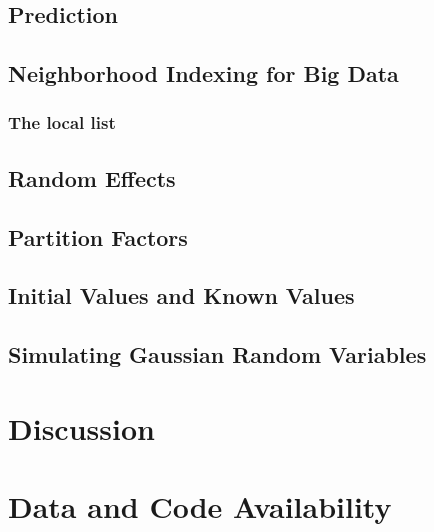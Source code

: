 \documentclass{article}
\begin{document}
\hypertarget{prediction}{%
\subsection{Prediction}\label{prediction}}

\hypertarget{neighborhood-indexing-for-big-data}{%
\subsection{Neighborhood Indexing for Big
Data}\label{neighborhood-indexing-for-big-data}}

\hypertarget{the-local-list}{%
\subsubsection{The local list}\label{the-local-list}}

\hypertarget{random-effects}{%
\subsection{Random Effects}\label{random-effects}}

\hypertarget{partition-factors}{%
\subsection{Partition Factors}\label{partition-factors}}

\hypertarget{initial-values-and-known-values}{%
\subsection{Initial Values and Known
Values}\label{initial-values-and-known-values}}

\hypertarget{simulating-gaussian-random-variables}{%
\subsection{Simulating Gaussian Random
Variables}\label{simulating-gaussian-random-variables}}

\hypertarget{discussion}{%
\section{Discussion}\label{discussion}}

\hypertarget{data-and-code-availability}{%
\section*{Data and Code Availability}\label{data-and-code-availability}}
\end{document}
